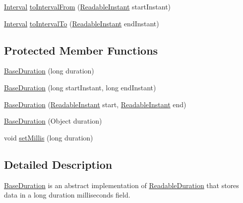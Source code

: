 \begin{DoxyCompactItemize}
\item 
\hyperlink{classorg_1_1joda_1_1time_1_1_interval}{Interval} \hyperlink{classorg_1_1joda_1_1time_1_1base_1_1_base_duration_a6088f85ae19ee1171195e64e7301f473}{to\-Interval\-From} (\hyperlink{interfaceorg_1_1joda_1_1time_1_1_readable_instant}{Readable\-Instant} start\-Instant)
\item 
\hyperlink{classorg_1_1joda_1_1time_1_1_interval}{Interval} \hyperlink{classorg_1_1joda_1_1time_1_1base_1_1_base_duration_a32011e2809fcfc33b92951f7413e98f9}{to\-Interval\-To} (\hyperlink{interfaceorg_1_1joda_1_1time_1_1_readable_instant}{Readable\-Instant} end\-Instant)
\end{DoxyCompactItemize}
\subsection*{Protected Member Functions}
\begin{DoxyCompactItemize}
\item 
\hyperlink{classorg_1_1joda_1_1time_1_1base_1_1_base_duration_add14e14b03a481383bebb20a05ba3dff}{Base\-Duration} (long duration)
\item 
\hyperlink{classorg_1_1joda_1_1time_1_1base_1_1_base_duration_a08086d3d4f1acd5766912c01e178cf4c}{Base\-Duration} (long start\-Instant, long end\-Instant)
\item 
\hyperlink{classorg_1_1joda_1_1time_1_1base_1_1_base_duration_a4b8ccc0f6d75fe929c4d6a20c18cc820}{Base\-Duration} (\hyperlink{interfaceorg_1_1joda_1_1time_1_1_readable_instant}{Readable\-Instant} start, \hyperlink{interfaceorg_1_1joda_1_1time_1_1_readable_instant}{Readable\-Instant} end)
\item 
\hyperlink{classorg_1_1joda_1_1time_1_1base_1_1_base_duration_a536bc3e343a80bad7b6948a55a055e67}{Base\-Duration} (Object duration)
\item 
void \hyperlink{classorg_1_1joda_1_1time_1_1base_1_1_base_duration_a4ae8cfbe62b7c82023a146f5a84c9521}{set\-Millis} (long duration)
\end{DoxyCompactItemize}


\subsection{Detailed Description}
\hyperlink{classorg_1_1joda_1_1time_1_1base_1_1_base_duration}{Base\-Duration} is an abstract implementation of \hyperlink{interfaceorg_1_1joda_1_1time_1_1_readable_duration}{Readable\-Duration} that stores data in a {\ttfamily long} duration milliseconds field. 

